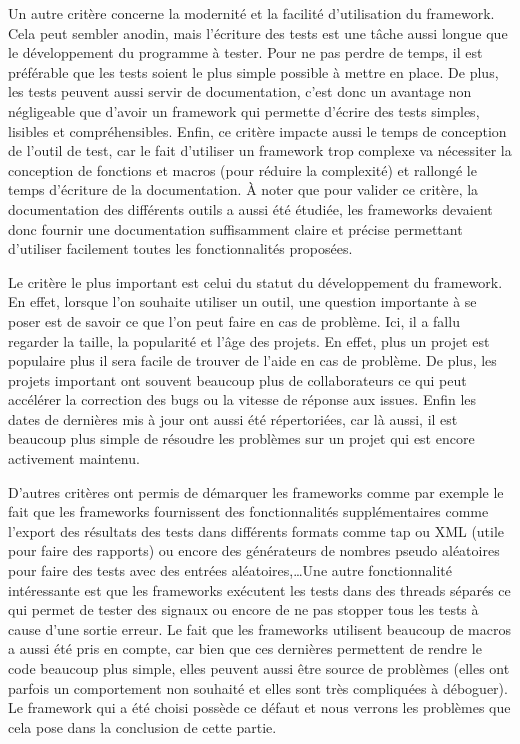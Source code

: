 \documentclass[a4paper]{article}
\begin{document}
Un autre critère concerne la modernité et la facilité d'utilisation du
framework. Cela peut sembler anodin, mais l'écriture des tests est une tâche
aussi longue que le développement du programme à tester. Pour ne pas perdre de
temps, il est préférable que les tests soient le plus simple possible à mettre
en place. De plus, les tests peuvent aussi servir de documentation, c'est donc
un avantage non négligeable que d'avoir un framework qui permette d'écrire des
tests simples, lisibles et compréhensibles. Enfin, ce critère impacte aussi le
temps de conception de l'outil de test, car le fait d'utiliser un framework trop
complexe va nécessiter la conception de fonctions et macros (pour réduire la
complexité) et rallongé le temps d'écriture de la documentation. À noter que
pour valider ce critère, la documentation des différents outils a aussi été
étudiée, les frameworks devaient donc fournir une documentation suffisamment
claire et précise permettant d'utiliser facilement toutes les fonctionnalités
proposées.

Le critère le plus important est celui du statut du développement du framework.
En effet, lorsque l'on souhaite utiliser un outil, une question importante à se
poser est de savoir ce que l'on peut faire en cas de problème. Ici, il a fallu
regarder la taille, la popularité et l'âge des projets. En effet, plus un projet
est populaire plus il sera facile de trouver de l'aide en cas de problème. De
plus, les projets important ont souvent beaucoup plus de collaborateurs ce qui
peut accélérer la correction des bugs ou la vitesse de réponse aux issues. Enfin
les dates de dernières mis à jour ont aussi été répertoriées, car là aussi, il
est beaucoup plus simple de résoudre les problèmes sur un projet qui est encore
activement maintenu.

D'autres critères ont permis de démarquer les frameworks comme par exemple le
fait que les frameworks fournissent des fonctionnalités supplémentaires comme
l'export des résultats des tests dans différents formats comme \gls{tap} ou XML
(utile pour faire des rapports) ou encore des générateurs de nombres pseudo
aléatoires pour faire des tests avec des entrées aléatoires,\dots Une autre
fonctionnalité intéressante est que les frameworks exécutent les tests dans des
threads séparés ce qui permet de tester des signaux ou encore de ne pas stopper
tous les tests à cause d'une sortie erreur. Le fait que les frameworks utilisent
beaucoup de macros a aussi été pris en compte, car bien que ces dernières
permettent de rendre le code beaucoup plus simple, elles peuvent aussi être
source de problèmes (elles ont parfois un comportement non souhaité et elles
sont très compliquées à déboguer). Le framework qui a été choisi possède ce
défaut et nous verrons les problèmes que cela pose dans la conclusion de cette
partie.
\end{document}
